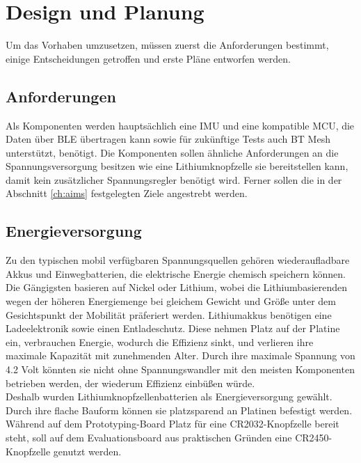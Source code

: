 \chapter{Design und Planung}
\label{ch:design}
Um das Vorhaben umzusetzen, müssen zuerst die Anforderungen bestimmt, einige Entscheidungen getroffen und erste Pläne entworfen werden.

\section{Anforderungen}
Als Komponenten werden hauptsächlich eine IMU und eine kompatible MCU, die Daten über BLE übertragen kann sowie für zukünftige Tests auch BT Mesh unterstützt, benötigt.
Die Komponenten sollen ähnliche Anforderungen an die Spannungsversorgung besitzen wie eine Lithiumknopfzelle sie bereitstellen kann, damit kein zusätzlicher Spannungsregler benötigt wird.
Ferner sollen die in der Abschnitt \ref{ch:aims} festgelegten Ziele angestrebt werden.

\section{Energieversorgung}
Zu den typischen mobil verfügbaren Spannungsquellen gehören wiederaufladbare Akkus und Einwegbatterien, die elektrische Energie chemisch speichern können.
Die Gängigsten basieren auf Nickel oder Lithium, wobei die Lithiumbasierenden wegen der höheren Energiemenge bei gleichem Gewicht und Größe unter dem Gesichtspunkt der Mobilität präferiert werden.
Lithiumakkus benötigen eine Ladeelektronik sowie einen Entladeschutz.
Diese nehmen Platz auf der Platine ein, verbrauchen Energie, wodurch die Effizienz sinkt, und verlieren ihre maximale Kapazität mit zunehmenden Alter.
Durch ihre maximale Spannung von 4.2 Volt könnten sie nicht ohne Spannungswandler mit den meisten Komponenten betrieben werden, der wiederum Effizienz einbüßen würde. \cite{site_liion}\\
Deshalb wurden Lithiumknopfzellenbatterien als Energieversorgung gewählt.
Durch ihre flache Bauform können sie platzsparend an Platinen befestigt werden.
Während auf dem Prototyping-Board Platz für eine CR2032-Knopfzelle bereit steht, soll auf dem Evaluationsboard aus praktischen Gründen eine CR2450-Knopfzelle genutzt werden.

